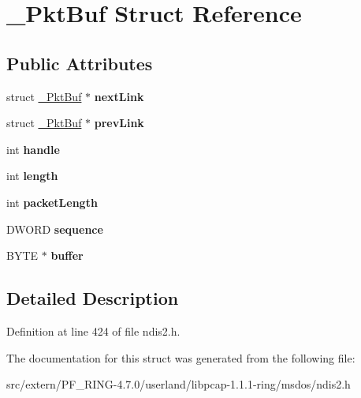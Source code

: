 \hypertarget{struct___pkt_buf}{
\section{\_\-PktBuf Struct Reference}
\label{struct___pkt_buf}
}
\subsection*{Public Attributes}
\begin{DoxyCompactItemize}
\item 
\hypertarget{struct___pkt_buf_a79c5e5aa58378aa5cb0f94fbcce346e6}{
struct \hyperlink{struct___pkt_buf}{\_\-PktBuf} $\ast$ {\bfseries nextLink}}
\label{struct___pkt_buf_a79c5e5aa58378aa5cb0f94fbcce346e6}

\item 
\hypertarget{struct___pkt_buf_a44814cfaa2cd6bb3bc12ccf34bd7d356}{
struct \hyperlink{struct___pkt_buf}{\_\-PktBuf} $\ast$ {\bfseries prevLink}}
\label{struct___pkt_buf_a44814cfaa2cd6bb3bc12ccf34bd7d356}

\item 
\hypertarget{struct___pkt_buf_ab784fb00da773031fdc173ec8f43f432}{
int {\bfseries handle}}
\label{struct___pkt_buf_ab784fb00da773031fdc173ec8f43f432}

\item 
\hypertarget{struct___pkt_buf_a960685f5b3d374762d3eb3469913e84d}{
int {\bfseries length}}
\label{struct___pkt_buf_a960685f5b3d374762d3eb3469913e84d}

\item 
\hypertarget{struct___pkt_buf_add144b9d25cb00d7952047d0dcac489e}{
int {\bfseries packetLength}}
\label{struct___pkt_buf_add144b9d25cb00d7952047d0dcac489e}

\item 
\hypertarget{struct___pkt_buf_a63ea539c521ae9b043a63b230891c44e}{
DWORD {\bfseries sequence}}
\label{struct___pkt_buf_a63ea539c521ae9b043a63b230891c44e}

\item 
\hypertarget{struct___pkt_buf_a39dd95928d990326474d407a49ba8fe8}{
BYTE $\ast$ {\bfseries buffer}}
\label{struct___pkt_buf_a39dd95928d990326474d407a49ba8fe8}

\end{DoxyCompactItemize}


\subsection{Detailed Description}


Definition at line 424 of file ndis2.h.



The documentation for this struct was generated from the following file:\begin{DoxyCompactItemize}
\item 
src/extern/PF\_\-RING-\/4.7.0/userland/libpcap-\/1.1.1-\/ring/msdos/ndis2.h\end{DoxyCompactItemize}
